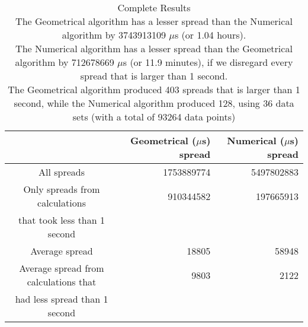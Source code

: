 \begin{table}[bth!]\footnotesize
 \begin{tabular}[3]{c|r|r}
 & Geometrical ($\mu$s) spread & Numerical ($\mu$s) spread\\
\hline
All spreads & 1753889774 & 5497802883 \\ 
\hline 
Only spreads from calculations & 910344582 & 197665913 \\ 
that took less than 1 second & & \\ 
\hline
Average spread & 18805 & 58948 \\
\hline
Average spread from calculations that & 9803 & 2122 \\ 
had less spread than 1 second & & \\ 
\end{tabular}\\ \\
\caption{Complete  Results\\
The Geometrical algorithm has a lesser spread than the Numerical algorithm by 3743913109 $\mu$s (or 1.04 hours).\\
The Numerical algorithm has a lesser spread than the Geometrical algorithm by 712678669 $\mu$s (or 11.9 minutes), if we disregard every spread that is larger than 1 second.\\
The Geometrical algorithm produced 403 spreads that is larger than 1 second, while the Numerical algorithm produced 128, using 36 data sets (with a total of 93264 data points)\\
}\label{total_spreadtable}\end{table}